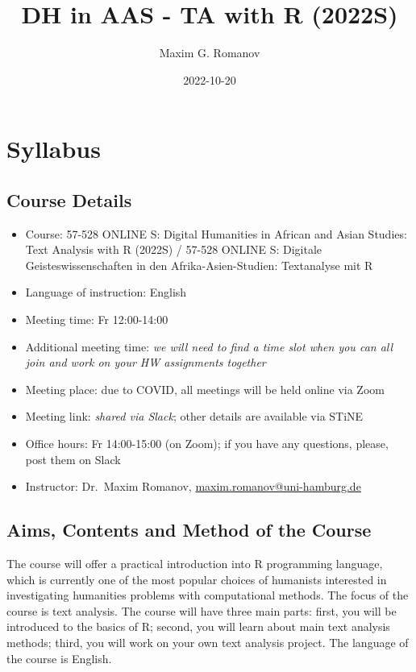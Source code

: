 \documentclass[
]{book}
\title{DH in AAS - TA with R (2022S)}
\author{Maxim G. Romanov}
\date{2022-10-20}
\providecommand{\tightlist}{%
  \setlength{\itemsep}{0pt}\setlength{\parskip}{0pt}}
\begin{document}
\maketitle

{
\setcounter{tocdepth}{1}
\tableofcontents
}
\hypertarget{syllabus}{%
\chapter*{Syllabus}\label{syllabus}}

\hypertarget{course-details}{%
\section*{Course Details}\label{course-details}}

\begin{itemize}
\tightlist
\item
  Course: 57-528 ONLINE S: Digital Humanities in African and Asian Studies: Text Analysis with R (2022S) / 57-528 ONLINE S: Digitale Geisteswissenschaften in den Afrika-Asien-Studien: Textanalyse mit R
\item
  Language of instruction: English
\item
  Meeting time: Fr 12:00-14:00
\item
  Additional meeting time: \emph{we will need to find a time slot when you can all join and work on your HW assignments together}
\item
  Meeting place: due to COVID, all meetings will be held online via Zoom
\item
  Meeting link: \emph{shared via Slack}; other details are available via STiNE
\item
  Office hours: Fr 14:00-15:00 (on Zoom); if you have any questions, please, post them on Slack
\item
  Instructor: Dr.~Maxim Romanov, \url{maxim.romanov@uni-hamburg.de}
\end{itemize}

\hypertarget{aims-contents-and-method-of-the-course}{%
\section{Aims, Contents and Method of the Course}\label{aims-contents-and-method-of-the-course}}

The course will offer a practical introduction into R programming language, which is currently one of the most popular choices of humanists interested in investigating humanities problems with computational methods. The focus of the course is text analysis. The course will have three main parts: first, you will be introduced to the basics of R; second, you will learn about main text analysis methods; third, you will work on your own text analysis project. The language of the course is English.
\end{document}

